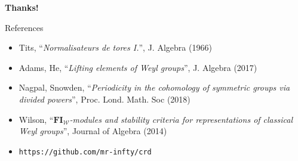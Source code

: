\documentclass[pdf]{beamer}
\begin{document}
\begin{frame}{}
   \begin{center}\Huge \textbf{Thanks!}\end{center}
\end{frame}

\begin{frame}{References}
   \begin{itemize}
      \item Tits, ``\textit{Normalisateurs de tores I.}'', J. Algebra (1966)
      \item Adams, He, ``\textit{Lifting elements of Weyl groups}'', J. Algebra (2017)
      \item Nagpal, Snowden, ``\textit{Periodicity in the cohomology of symmetric groups via divided powers}'', Proc. Lond. Math. Soc (2018)
      \item Wilson, ``\textit{$\mathbf{FI}_{\mathcal{W}}$-modules and stability criteria for representations of classical Weyl groups}'', Journal of Algebra (2014)
      \item \texttt{https://github.com/mr-infty/crd}
   \end{itemize}
\end{frame}
\end{document}
